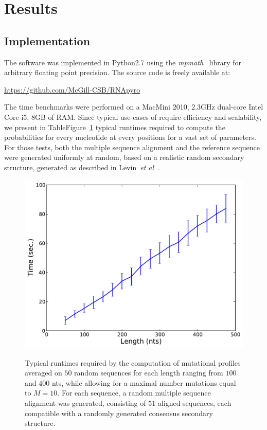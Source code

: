 \section{Results}
\label{sec:results}

\subsection{Implementation}
The software was implemented in Python2.7 using the \textit{mpmath}~\cite{mpmath} library
for  arbitrary floating point precision. The source code is freely available at:

{\centering \url{https://github.com/McGill-CSB/RNApyro}\\}

The time benchmarks were performed on a MacMini 2010, 2.3GHz dual-core Intel Core i5, 8GB of RAM.
Since typical use-cases of \RNApyro require
 efficiency and scalability, we present in TableFigure~\ref{fig:time} typical runtimes required to compute the probabilities for  every nucleotide at every positions for a vast set of parameters. For those tests,
 both the multiple sequence alignment and the reference sequence were generated uniformly at random, based on a realistic random secondary structure, generated as described in Levin~\emph{et al}~\cite{Levin:2012kx}.


\begin{figure}[t]
{\centering \includegraphics[width=.5\linewidth]{figures/TimeBenchmark}\\}

\caption{Typical runtimes required by the computation of mutational profiles 
averaged on $50$ random sequences for each length ranging from $100$ and $400$ nts, while allowing for a maximal number mutations equal to $M=10$. 
For each sequence, a random multiple sequence alignment was generated, consisting of $51$ aligned sequences, each compatible with a randomly generated consensus secondary structure. 
}
\label{fig:time}
\end{figure}


